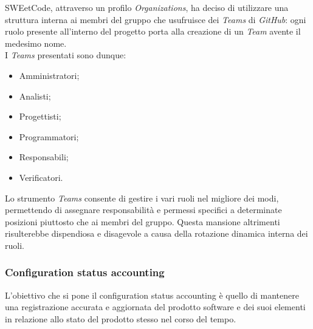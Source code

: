 \documentclass[10pt, a4paper]{article}
\begin{document}
SWEetCode, attraverso un profilo \textit{Organizations}, ha deciso di utilizzare una struttura interna ai membri del gruppo che usufruisce dei \textit{Teams} di 
\textit{GitHub}: ogni ruolo presente all'interno del progetto porta alla creazione di un \textit{Team} avente il medesimo nome.\\
I \textit{Teams} presentati sono dunque:
\begin{itemize}
    \item Amministratori;
    \item Analisti;
    \item Progettisti;
    \item Programmatori;
    \item Responsabili;
    \item Verificatori.
\end{itemize}
Lo strumento \textit{Teams} consente di gestire i vari ruoli nel migliore dei modi, permettendo di assegnare responsabilità e permessi specifici a determinate posizioni 
piuttosto che ai membri del gruppo. Questa mansione altrimenti risulterebbe dispendiosa e disagevole a causa della rotazione dinamica interna dei ruoli. 

\subsubsection{Configuration status accounting}
L'obiettivo che si pone il configuration status accounting è quello di mantenere una registrazione accurata e aggiornata del prodotto software e dei suoi elementi in relazione allo stato del prodotto stesso nel corso del tempo.
\end{document}
